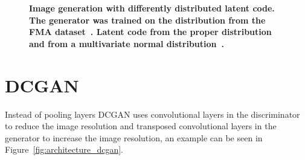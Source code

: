     \begin{figure}[h]
        \centering
        \caption[Image generation with differently distributed latent code]
        {
            \textbf{Image generation with differently distributed latent code. The generator was trained on the distribution from the FMA dataset~\cite{FMA}. Latent code from the proper distribution~ and from a multivariate normal distribution~.}
        }
        \label{fig:distribution}
    \end{figure}
    
    \section{DCGAN}

        Instead of pooling layers DCGAN uses convolutional layers in the discriminator to reduce the image resolution and transposed convolutional layers in the generator to increase the image resolution, an example can be seen in Figure~\ref{fig:architecture_dcgan}.
        
